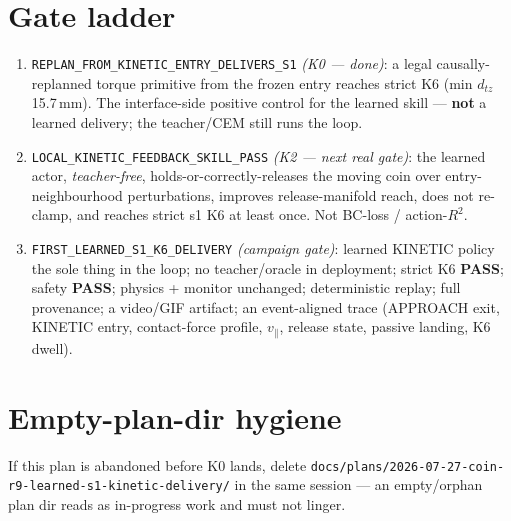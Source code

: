 \documentclass[11pt]{article}
\newcommand{\code}[1]{\texttt{\small #1}}
\newcommand{\ok}{\textcolor{green!50!black}{\textbf{PASS}}}
\begin{document}
\section{Gate ladder}
\begin{enumerate}[nosep,leftmargin=1.6em]
  \item \code{REPLAN\_FROM\_KINETIC\_ENTRY\_DELIVERS\_S1} \emph{(K0 --- done)}: a legal causally-replanned torque primitive
  from the frozen entry reaches strict K6 (min $d_{tz}$ 15.7\,mm). The interface-side positive control for the learned skill
  --- \textbf{not} a learned delivery; the teacher/CEM still runs the loop.
  \item \code{LOCAL\_KINETIC\_FEEDBACK\_SKILL\_PASS} \emph{(K2 --- next real gate)}: the learned actor, \emph{teacher-free},
  holds-or-correctly-releases the moving coin over entry-neighbourhood perturbations, improves release-manifold reach, does not
  re-clamp, and reaches strict s1 K6 at least once. Not BC-loss / action-$R^2$.
  \item \code{FIRST\_LEARNED\_S1\_K6\_DELIVERY} \emph{(campaign gate)}: learned KINETIC policy the sole thing in the loop; no
  teacher/oracle in deployment; strict K6 \ok{}; safety \ok{}; physics + monitor unchanged; deterministic replay; full
  provenance; a video/GIF artifact; an event-aligned trace (APPROACH exit, KINETIC entry, contact-force profile,
  $v_\parallel$, release state, passive landing, K6 dwell).
\end{enumerate}

\section{Empty-plan-dir hygiene}
If this plan is abandoned before K0 lands, delete
\code{docs/plans/2026-07-27-coin-r9-learned-s1-kinetic-delivery/} in the same session --- an empty/orphan plan dir reads
as in-progress work and must not linger.
\end{document}
